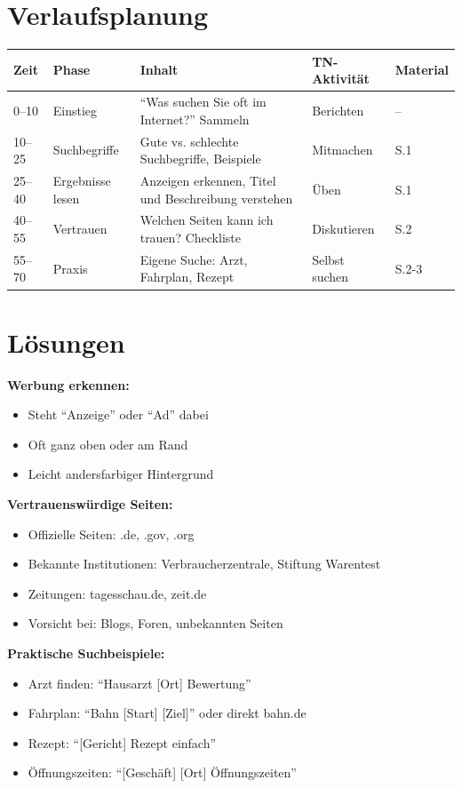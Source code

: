 \documentclass[11pt,a4paper]{article}
\begin{document}
\section{Verlaufsplanung}

\begin{longtable}{|p{1cm}|p{2cm}|p{5cm}|p{3cm}|p{2cm}|}
\hline
\textbf{Zeit} & \textbf{Phase} & \textbf{Inhalt} & \textbf{TN-Aktivität} & \textbf{Material} \\
\hline
0--10 & Einstieg & ``Was suchen Sie oft im Internet?'' Sammeln & Berichten & -- \\
\hline
10--25 & Suchbegriffe & Gute vs. schlechte Suchbegriffe, Beispiele & Mitmachen & S.1 \\
\hline
25--40 & Ergebnisse lesen & Anzeigen erkennen, Titel und Beschreibung verstehen & Üben & S.1 \\
\hline
40--55 & Vertrauen & Welchen Seiten kann ich trauen? Checkliste & Diskutieren & S.2 \\
\hline
55--70 & Praxis & Eigene Suche: Arzt, Fahrplan, Rezept & Selbst suchen & S.2-3 \\
\hline
\end{longtable}

\section{Lösungen}

\textbf{Werbung erkennen:}
\begin{itemize}
    \item Steht ``Anzeige'' oder ``Ad'' dabei
    \item Oft ganz oben oder am Rand
    \item Leicht andersfarbiger Hintergrund
\end{itemize}

\textbf{Vertrauenswürdige Seiten:}
\begin{itemize}
    \item Offizielle Seiten: .de, .gov, .org
    \item Bekannte Institutionen: Verbraucherzentrale, Stiftung Warentest
    \item Zeitungen: tagesschau.de, zeit.de
    \item Vorsicht bei: Blogs, Foren, unbekannten Seiten
\end{itemize}

\textbf{Praktische Suchbeispiele:}
\begin{itemize}
    \item Arzt finden: ``Hausarzt [Ort] Bewertung''
    \item Fahrplan: ``Bahn [Start] [Ziel]'' oder direkt bahn.de
    \item Rezept: ``[Gericht] Rezept einfach''
    \item Öffnungszeiten: ``[Geschäft] [Ort] Öffnungszeiten''
\end{itemize}
\end{document}
